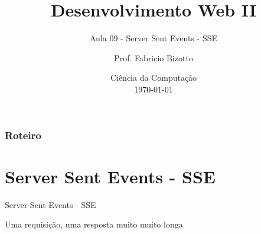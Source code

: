 \documentclass[
	9pt, %
	t, %
]{beamer}
\title[DesWebII]{Desenvolvimento Web II} %
\subtitle{Aula 09 - Server Sent Events - SSE} %
\author[Fabricio Bizotto]{Prof. Fabricio Bizotto} %
\institute[IFC]{Instituto Federal Catarinense \\ \smallskip \textit{fabricio.bizotto@ifc.edu.br}} %
\date[\today]{Ciência da Computação \\ \today} %
\begin{document}

\begin{frame}
	\titlepage %
\end{frame}


\begin{frame}
	\frametitle{Roteiro} %
	
	\tableofcontents %
\end{frame}


\section{Server Sent Events - SSE}


\begin{frame}
	\begin{center}
		
		\bigskip\bigskip\bigskip\bigskip %
		{\Large Server Sent Events - SSE}
		
		\bigskip\bigskip %
		{\Huge Uma requisição, uma resposta muito muito longa}
		
	\end{center}

\end{frame}
\end{document}
